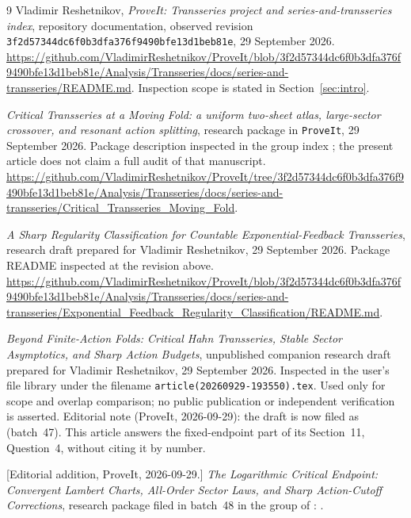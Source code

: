 \documentclass[11pt,a4paper]{article}
\numberwithin{equation}{section}
\theoremstyle{definition}
\theoremstyle{remark}
\newcommand{\repo}{\texttt{ProveIt}}
\begin{document}
{}
\begin{thebibliography}{9}
Vladimir Reshetnikov, \emph{ProveIt: Transseries project and series-and-transseries
index}, repository documentation, observed revision
\texttt{3f2d57344dc6f0b3dfa376f9490bfe13d1beb81e}, 29 September 2026.
\url{https://github.com/VladimirReshetnikov/ProveIt/blob/3f2d57344dc6f0b3dfa376f9490bfe13d1beb81e/Analysis/Transseries/docs/series-and-transseries/README.md}.
Inspection scope is stated in Section~\ref{sec:intro}.

\emph{Critical Transseries at a Moving Fold: a uniform two-sheet atlas,
large-sector crossover, and resonant action splitting}, research package in
\repo, 29 September 2026. Package description inspected in the group index
\cite{repo-index}; the present article does not claim a full audit of that
manuscript.
\url{https://github.com/VladimirReshetnikov/ProveIt/tree/3f2d57344dc6f0b3dfa376f9490bfe13d1beb81e/Analysis/Transseries/docs/series-and-transseries/Critical_Transseries_Moving_Fold}.

\emph{A Sharp Regularity Classification for Countable Exponential-Feedback
Transseries}, research draft prepared for Vladimir Reshetnikov,
29 September 2026. Package README inspected at the revision above.
\url{https://github.com/VladimirReshetnikov/ProveIt/blob/3f2d57344dc6f0b3dfa376f9490bfe13d1beb81e/Analysis/Transseries/docs/series-and-transseries/Exponential_Feedback_Regularity_Classification/README.md}.

\emph{Beyond Finite-Action Folds: Critical Hahn Transseries, Stable Sector
Asymptotics, and Sharp Action Budgets}, unpublished companion research draft
prepared for Vladimir Reshetnikov, 29 September 2026. Inspected in the user's
file library under the filename \texttt{article(20260929-193550).tex}.
Used only for scope and overlap comparison; no public publication or
independent verification is asserted.
Editorial note (ProveIt, 2026-09-29): the draft is now filed as
(batch~47). This article answers the fixed-endpoint part of its Section~11,
Question~4, without citing it by number.

[Editorial addition, ProveIt, 2026-09-29.]
\emph{The Logarithmic Critical Endpoint: Convergent Lambert Charts,
All-Order Sector Laws, and Sharp Action-Cutoff Corrections}, research
package filed in batch~48 in the group of \cite{repo-index}:
.


\end{thebibliography}
\end{document}
